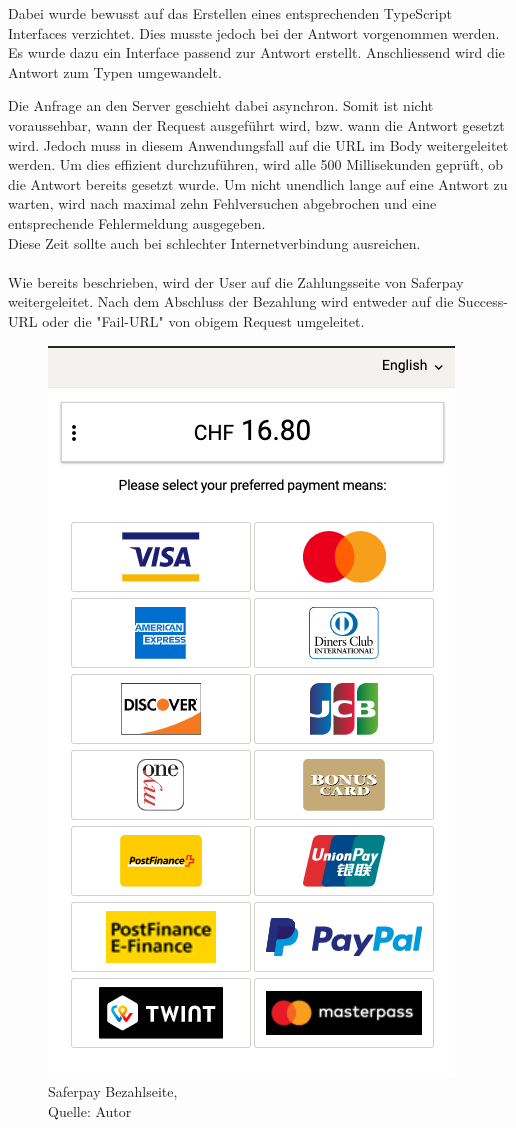Dabei wurde bewusst auf das Erstellen eines entsprechenden TypeScript Interfaces verzichtet. 
Dies musste jedoch bei der Antwort vorgenommen werden. 
Es wurde dazu ein Interface passend zur Antwort erstellt. Anschliessend wird die Antwort zum Typen umgewandelt. 

Die Anfrage an den Server geschieht dabei asynchron. Somit ist nicht voraussehbar, wann der Request ausgeführt wird, bzw. wann die Antwort gesetzt wird. Jedoch muss in diesem Anwendungsfall auf die URL im Body weitergeleitet werden. Um  dies effizient durchzuführen, wird alle 500 Millisekunden geprüft, ob die Antwort bereits gesetzt wurde. Um nicht unendlich lange auf eine Antwort zu warten, wird nach maximal zehn Fehlversuchen abgebrochen und eine entsprechende Fehlermeldung ausgegeben. \\
Diese Zeit sollte auch bei schlechter Internetverbindung ausreichen. \\\\
Wie bereits beschrieben, wird der User auf die Zahlungsseite von Saferpay weitergeleitet. Nach dem Abschluss der Bezahlung wird entweder auf die Success-URL oder die "Fail-URL" von obigem Request umgeleitet. 
\begin{figure}[H]
	\centering
	\includegraphics[scale=0.5]{images/paymentSaferpay.PNG}
	\caption[Saferpay Bezahlseite]{Saferpay Bezahlseite,\\ Quelle: Autor}
	\label{img: paymentSaferpay}
\end{figure} 


